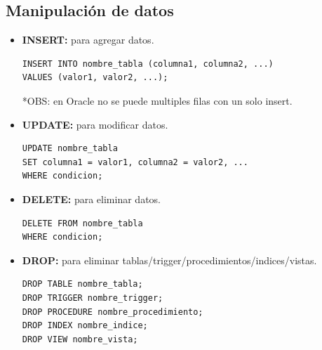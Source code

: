 \documentclass{templateNote}
\begin{document}
\newpage
\subsection{Manipulación de datos}
\begin{itemize}
    \item \textbf{INSERT:} para agregar datos.
    \begin{tcolorbox}[
        colframe=Verde!100, %
        colback=Verde!20,       %
        coltitle=black!100, %
        title=\textbf{PL/SQL}, %
    ]
        \begin{Verbatim}[breaklines=true]
INSERT INTO nombre_tabla (columna1, columna2, ...)
VALUES (valor1, valor2, ...);
        \end{Verbatim}
    \end{tcolorbox}
*OBS: en Oracle no se puede multiples filas con un solo insert.
    
    \item \textbf{UPDATE:} para modificar datos.
    \begin{tcolorbox}[
        colframe=Verde!100, %
        colback=Verde!20,       %
        coltitle=black!100, %
        title=\textbf{PL/SQL}, %
    ]
        \begin{Verbatim}[breaklines=true]
UPDATE nombre_tabla
SET columna1 = valor1, columna2 = valor2, ...
WHERE condicion;
        \end{Verbatim}
    \end{tcolorbox}

    \item \textbf{DELETE:} para eliminar datos.
    \begin{tcolorbox}[
        colframe=red!90!black, %
        colback=red!20,        %
        coltitle=white!100, %
        title=\textbf{PL/SQL}, %
    ]
        \begin{Verbatim}[breaklines=true]
DELETE FROM nombre_tabla
WHERE condicion;
        \end{Verbatim}
    \end{tcolorbox}

    \item \textbf{DROP:} para eliminar tablas/trigger/procedimientos/indices/vistas.
    \begin{tcolorbox}[
        colframe=red!90!black, %
        colback=red!20,       %
        coltitle=white!100, %
        title=\textbf{PL/SQL}, %
    ]
        \begin{Verbatim}[breaklines=true]
DROP TABLE nombre_tabla;
DROP TRIGGER nombre_trigger;
DROP PROCEDURE nombre_procedimiento;
DROP INDEX nombre_indice;
DROP VIEW nombre_vista;
        \end{Verbatim}
    \end{tcolorbox}
\end{itemize}
\end{document}
